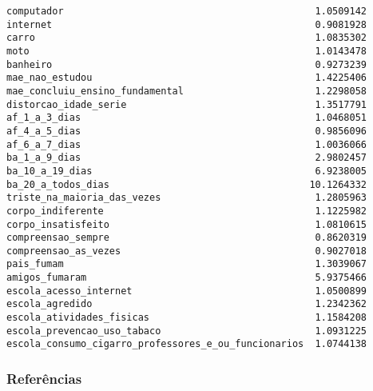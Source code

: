 \documentclass[
]{article}
\begin{document}
\begin{verbatim}
computador                                            1.0509142
internet                                              0.9081928
carro                                                 1.0835302
moto                                                  1.0143478
banheiro                                              0.9273239
mae_nao_estudou                                       1.4225406
mae_concluiu_ensino_fundamental                       1.2298058
distorcao_idade_serie                                 1.3517791
af_1_a_3_dias                                         1.0468051
af_4_a_5_dias                                         0.9856096
af_6_a_7_dias                                         1.0036066
ba_1_a_9_dias                                         2.9802457
ba_10_a_19_dias                                       6.9238005
ba_20_a_todos_dias                                   10.1264332
triste_na_maioria_das_vezes                           1.2805963
corpo_indiferente                                     1.1225982
corpo_insatisfeito                                    1.0810615
compreensao_sempre                                    0.8620319
compreensao_as_vezes                                  0.9027018
pais_fumam                                            1.3039067
amigos_fumaram                                        5.9375466
escola_acesso_internet                                1.0500899
escola_agredido                                       1.2342362
escola_atividades_fisicas                             1.1584208
escola_prevencao_uso_tabaco                           1.0931225
escola_consumo_cigarro_professores_e_ou_funcionarios  1.0744138
\end{verbatim}

\hypertarget{referuxeancias}{%
\subsubsection{Referências}\label{referuxeancias}}
\end{document}
